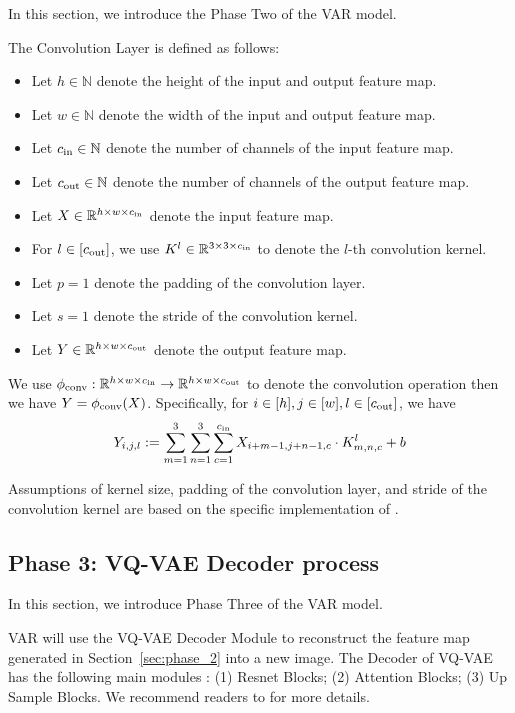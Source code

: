 In this section, we introduce the Phase Two of the VAR model.

\begin{definition}\label{def:conv_layer}
    The Convolution Layer is defined as follows:
    \begin{itemize}
        \item Let $h \in \mathbb{N}$ denote the height of the input and output feature map.
        \item Let $w \in \mathbb{N}$ denote the width of the input and output feature map.
        \item Let $c_{\rm in} \in \mathbb{N}$ denote the number of channels of the input feature map.
        \item Let $c_{\rm out} \in \mathbb{N}$ denote the number of channels of the output feature map.
        \item Let $X \in \mathbb{R}^{h \times w \times c_{\rm in}}$ denote the input feature map.
        
        \item For $l \in [c_{\rm out}]$, we use $K^l \in \mathbb{R}^{3 \times 3 \times c_{\rm in}}$ to denote the $l$-th convolution kernel.
        \item Let $p = 1$ denote the padding of the convolution layer.
        \item Let $s = 1$ denote the stride of the convolution kernel.
        \item Let $Y \in \mathbb{R}^{h \times w \times c_{\rm out}}$ denote the output feature map.
    \end{itemize}
    We use $\phi_{\rm conv}: \mathbb{R}^{h \times w \times c_{\rm in}} \to \mathbb{R}^{h \times w \times c_{\rm out}}$ to denote the convolution operation then we have $Y = \phi_{\rm conv}(X)$. Specifically, for $i \in [h], j \in [w], l \in [c_{\rm out}]$, we have
    \begin{align*}
        Y_{i,j,l} := \sum_{m=1}^3 \sum_{n=1}^3 \sum_{c = 1}^{c_{\rm in}} X_{i+m-1,j+n-1,c} \cdot K^l_{m,n,c} + b
    \end{align*}
\end{definition}

\begin{remark}
    Assumptions of kernel size, padding of the convolution layer, and stride of the convolution kernel are based on the specific implementation of \cite{tjy+24}.
\end{remark}

\subsection{Phase 3: VQ-VAE Decoder process}\label{sec:phase_3} 

In this section, we introduce Phase Three of the VAR model.

VAR will use the VQ-VAE Decoder Module to reconstruct the feature map generated in Section~\ref{sec:phase_2} into a new image. The Decoder of VQ-VAE has the following main modules \cite{kll+25}: (1) Resnet Blocks; (2) Attention Blocks; (3) Up Sample Blocks. We recommend readers to \cite{kll+25} for more details. 
